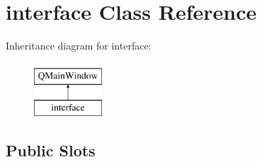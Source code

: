 \hypertarget{classinterface}{}\section{interface Class Reference}
\label{classinterface}
Inheritance diagram for interface\+:\begin{figure}[H]
\begin{center}
\leavevmode
\includegraphics[height=2.000000cm]{classinterface}
\end{center}
\end{figure}
\subsection*{Public Slots}
